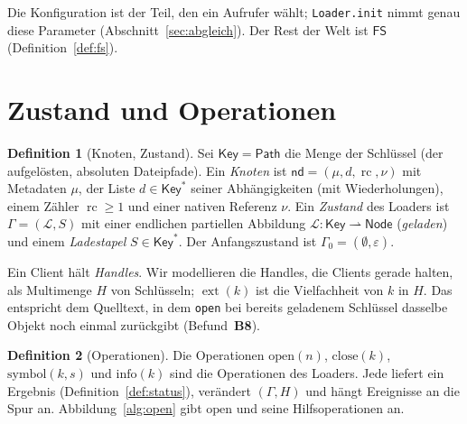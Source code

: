 \documentclass[a4paper,12pt,twoside]{report}
\DeclareRobustCommand{\_}{\ifmmode\mbox{\textunderscore}\else\textunderscore\allowbreak{}\fi}
\theoremstyle{definition}
\newtheorem{definition}{Definition}[chapter]
\newcommand{\Bf}[1]{\textbf{B#1}}
\newcommand{\Path}{\mathsf{Path}}
\newcommand{\FS}{\mathsf{FS}}
\newcommand{\ext}{\operatorname{ext}}
\newcommand{\rc}{\operatorname{rc}}
\begin{document}
Die Konfiguration ist der Teil, den ein Aufrufer wählt; \texttt{Loader.\_\_init\_\_} nimmt genau diese Parameter (Abschnitt~\ref{sec:abgleich}). Der Rest der Welt ist $\FS$ (Definition~\ref{def:fs}).

\section{Zustand und Operationen}

\begin{definition}[Knoten, Zustand]
	\label{def:zustand}
	Sei $\mathsf{Key}=\Path$ die Menge der Schlüssel (der aufgelösten, absoluten Dateipfade). Ein \emph{Knoten} ist $\mathsf{nd}=(\mu,d,\rc,\nu)$ mit Metadaten $\mu$, der Liste $d\in\mathsf{Key}^*$ seiner Abhängigkeiten (mit Wiederholungen), einem Zähler $\rc\ge1$ und einer nativen Referenz $\nu$. Ein \emph{Zustand} des Loaders ist $\Gamma=(\mathcal L,S)$ mit einer endlichen partiellen Abbildung $\mathcal L:\mathsf{Key}\rightharpoonup\mathsf{Node}$ (\emph{geladen}) und einem \emph{Ladestapel} $S\in\mathsf{Key}^*$. Der Anfangszustand ist $\Gamma_0=(\emptyset,\varepsilon)$.
\end{definition}

Ein Client hält \emph{Handles}. Wir modellieren die Handles, die Clients gerade halten, als Multimenge $H$ von Schlüsseln; $\ext(k)$ ist die Vielfachheit von $k$ in $H$. Das entspricht dem Quelltext, in dem \texttt{open} bei bereits geladenem Schlüssel dasselbe Objekt noch einmal zurückgibt (Befund~\Bf{8}).

\begin{definition}[Operationen]
	Die Operationen $\mathrm{open}(n)$, $\mathrm{close}(k)$, $\mathrm{symbol}(k,s)$ und $\mathrm{info}(k)$ sind die Operationen des Loaders. Jede liefert ein Ergebnis (Definition~\ref{def:status}), verändert $(\Gamma,H)$ und hängt Ereignisse an die Spur an. Abbildung~\ref{alg:open} gibt $\mathrm{open}$ und seine Hilfsoperationen an.
\end{definition}
\end{document}
